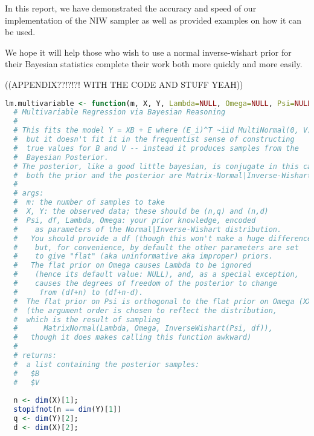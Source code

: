\documentclass[english]{report}
\begin{document}


In this report, we have demonstrated the accuracy and speed of our implementation of the NIW sampler as well as provided examples on how it can be used. 

We hope it will help those who wish to use a normal inverse-wishart prior for their Bayesian statistics complete their work both more quickly and more easily.


((APPENDIX??!?!?! WITH THE CODE AND STUFF YEAH))
\begin{lstlisting}[frame=single, language=R]
lm.multivariable <- function(m, X, Y, Lambda=NULL, Omega=NULL, Psi=NULL, df=71) { # TODO: Not sure what to name this.
  # Multivariable Regression via Bayesian Reasoning
  # 
  # This fits the model Y = XB + E where (E_i)^T ~iid MultiNormal(0, V)
  #  but it doesn't fit it in the frequentist sense of constructing
  #  true values for B and V -- instead it produces samples from the
  #  Bayesian Posterior.
  # The posterior, like a good little bayesian, is conjugate in this case:
  #  both the prior and the posterior are Matrix-Normal|Inverse-Wisharts.
  #
  # args:
  #  m: the number of samples to take
  #  X, Y: the observed data; these should be (n,q) and (n,d)
  #  Psi, df, Lambda, Omega: your prior knowledge, encoded
  #    as parameters of the Normal|Inverse-Wishart distribution.
  #   You should provide a df (though this won't make a huge difference)
  #    but, for convenience, by default the other parameters are set
  #    to give "flat" (aka uninformative aka improper) priors. 
  #   The flat prior on Omega causes Lambda to be ignored
  #    (hence its default value: NULL), and, as a special exception,
  #    causes the degrees of freedom of the posterior to change
  #     from (df+n) to (df+n-d).
  #  The flat prior on Psi is orthogonal to the flat prior on Omega (XXX is this true? surely it has some effect, even if only numerical/speed/something)
  #  (the argument order is chosen to reflect the distribution,
  #  which is the result of sampling
  #      MatrixNormal(Lambda, Omega, InverseWishart(Psi, df)), 
  #   though it does makes calling this function awkward)
  # 
  # returns:
  #  a list containing the posterior samples:
  #   $B
  #   $V
  
  n <- dim(X)[1];
  stopifnot(n == dim(Y)[1])
  q <- dim(Y)[2];
  d <- dim(X)[2];
  

\end{lstlisting}
\end{document}
